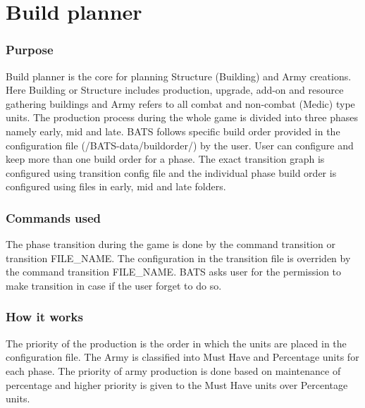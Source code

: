 \section{Build planner}
\subsubsection{Purpose}
Build planner is the core for planning Structure (Building) and Army creations. Here Building or Structure includes production, upgrade, add-on and resource gathering buildings and Army refers to all combat and non-combat (Medic) type units. The production process during the whole game is divided into three phases namely early, mid and late. BATS follows specific build order provided in the configuration file (/BATS-data/buildorder/) by the user. User can configure and keep more than one build order for a phase. The exact transition graph is configured using transition config file and the individual phase build order is configured using files in early, mid and late folders.

\subsubsection{Commands used}
The phase transition during the game is done by the command transition or transition FILE\_NAME. The configuration in the transition file is overriden by the command transition FILE\_NAME. BATS asks user for the permission to make transition in case if the user forget to do so.

\subsubsection{How it works}
The priority of the production is the order in which the units are placed in the configuration file. The Army is classified into Must Have and Percentage units for each phase. The priority of army production is done based on maintenance of percentage and higher priority is given to the Must Have units over Percentage units.

